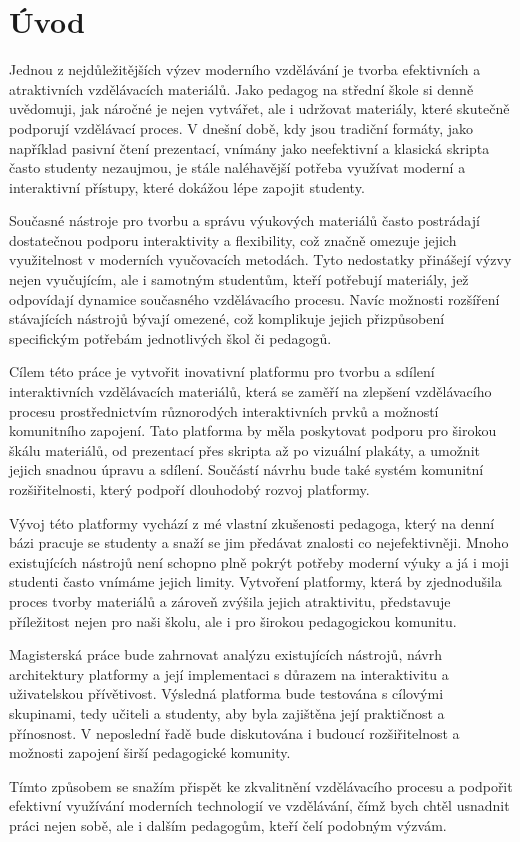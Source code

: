 \chapter*{Úvod}
\setcounter{page}{1}

Jednou z nejdůležitějších výzev moderního vzdělávání je tvorba efektivních a atraktivních vzdělávacích materiálů.
Jako pedagog na střední škole si denně uvědomuji, jak náročné je nejen vytvářet, ale i udržovat materiály, které skutečně podporují vzdělávací proces.
V dnešní době, kdy jsou tradiční formáty, jako například pasivní čtení prezentací, vnímány jako neefektivní a klasická skripta často studenty nezaujmou, je stále naléhavější potřeba využívat moderní a interaktivní přístupy, které dokážou lépe zapojit studenty.

Současné nástroje pro tvorbu a správu výukových materiálů často postrádají dostatečnou podporu interaktivity a flexibility, což značně omezuje jejich využitelnost v moderních vyučovacích metodách.
Tyto nedostatky přinášejí výzvy nejen vyučujícím, ale i samotným studentům, kteří potřebují materiály, jež odpovídají dynamice současného vzdělávacího procesu.
Navíc možnosti rozšíření stávajících nástrojů bývají omezené, což komplikuje jejich přizpůsobení specifickým potřebám jednotlivých škol či pedagogů.

Cílem této práce je vytvořit inovativní platformu pro tvorbu a sdílení interaktivních vzdělávacích materiálů, která se zaměří na zlepšení vzdělávacího procesu prostřednictvím různorodých interaktivních prvků a možností komunitního zapojení.
Tato platforma by měla poskytovat podporu pro širokou škálu materiálů, od prezentací přes skripta až po vizuální plakáty, a umožnit jejich snadnou úpravu a sdílení.
Součástí návrhu bude také systém komunitní rozšiřitelnosti, který podpoří dlouhodobý rozvoj platformy.

Vývoj této platformy vychází z mé vlastní zkušenosti pedagoga, který na denní bázi pracuje se studenty a snaží se jim předávat znalosti co nejefektivněji. 
Mnoho existujících nástrojů není schopno plně pokrýt potřeby moderní výuky a já i moji studenti často vnímáme jejich limity.
Vytvoření platformy, která by zjednodušila proces tvorby materiálů a zároveň zvýšila jejich atraktivitu, představuje příležitost nejen pro naši školu, ale i pro širokou pedagogickou komunitu.

Magisterská práce bude zahrnovat analýzu existujících nástrojů, návrh architektury platformy a její implementaci s důrazem na interaktivitu a uživatelskou přívětivost.
Výsledná platforma bude testována s cílovými skupinami, tedy učiteli a studenty, aby byla zajištěna její praktičnost a přínosnost.
V neposlední řadě bude diskutována i budoucí rozšiřitelnost a možnosti zapojení širší pedagogické komunity.

Tímto způsobem se snažím přispět ke zkvalitnění vzdělávacího procesu a podpořit efektivní využívání moderních technologií ve vzdělávání, čímž bych chtěl usnadnit práci nejen sobě, ale i dalším pedagogům, kteří čelí podobným výzvám.
